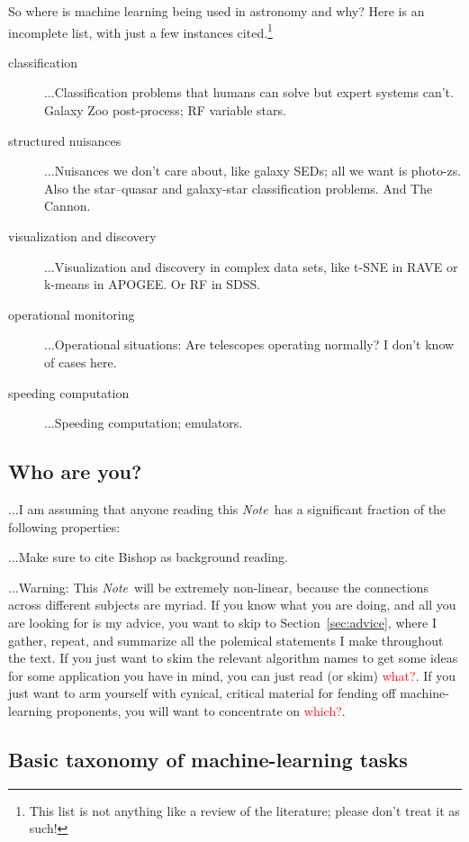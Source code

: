 \documentclass[12pt, twoside, letterpaper]{article}
\newcommand{\documentname}{\textsl{Note}}
\newcommand{\sectionname}{Section}
\newcommand{\todo}[1]{\textcolor{red}{#1}}  %
\begin{document}
So where is machine learning being used in astronomy and why?  Here is
an incomplete list, with just a few instances cited.\footnote{This
  list is not anything like a review of the literature; please don't
  treat it as such!}
\begin{description}
\item[classification]
...Classification problems that humans can solve but expert systems
can't. Galaxy Zoo post-process; RF variable stars.
\item[structured nuisances]
...Nuisances we don't care about, like galaxy SEDs; all we want is
photo-zs. Also the star--quasar and galaxy-star classification
problems. And The Cannon.
\item[visualization and discovery]
...Visualization and discovery in complex data sets, like t-SNE in RAVE
or k-means in APOGEE. Or RF in SDSS.
\item[operational monitoring]
...Operational situations: Are telescopes operating normally? I don't know
of cases here.
\item[speeding computation]
...Speeding computation; emulators.
\end{description}

\subsection{Who are you?}

...I am assuming that anyone reading this \documentname\ has a
significant fraction of the following properties:

...Make sure to cite Bishop as background reading.

...Warning: This \documentname\ will be extremely non-linear, because
the connections across different subjects are myriad. If you know what
you are doing, and all you are looking for is my advice, you
want to skip to \sectionname~\ref{sec:advice}, where I gather, repeat,
and summarize all the polemical statements I make throughout the text.
If you just want to skim the relevant
algorithm names to get some ideas for some application you have in
mind, you can just read (or skim) \todo{what?}. If you just want to arm
yourself with cynical, critical material for fending off machine-learning
proponents, you will want to concentrate on \todo{which?}.

\subsection{Basic taxonomy of machine-learning tasks}
\end{document}
